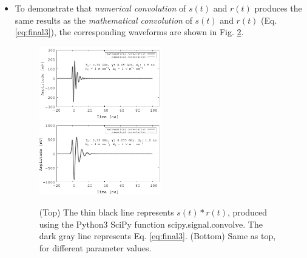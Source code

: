 \documentclass[amsmath,amssymb,aps,prd,10pt,twocolumn,showkeys]{revtex4}
\begin{document}
\begin{itemize}
\begin{figure}[ht]
\caption{\label{fig:fig1} (Top) The thin black line represents $s(t) * r(t)$.  The light gray envelope represents the envelope of $s(t) * r(t)$ computed with the Python3 SciPy function scipy.special.hilbert. The dark gray envelope represents Eq. \ref{eq:final}-\ref{eq:final2}. (Bottom) Same as top, for different parameter values.}
\end{figure}
\item To demonstrate that \textit{numerical convolution} of $s(t)$ and $r(t)$ produces the same results as the \textit{mathematical convolution} of $s(t)$ and $r(t)$ (Eq. \ref{eq:final3}), the corresponding waveforms are shown in Fig. \ref{fig:fig2}.
\begin{figure}[ht]
\centering
\includegraphics[width=0.5\textwidth]{July7th_plot1.pdf}
\includegraphics[width=0.5\textwidth]{July7th_plot2.pdf}
\caption{\label{fig:fig2} (Top) The thin black line represents $s(t) * r(t)$, produced using the Python3 SciPy function scipy.signal.convolve. The dark gray line represents Eq. \ref{eq:final3}. (Bottom) Same as top, for different parameter values.}
\end{figure}


\end{itemize}
\end{document}
